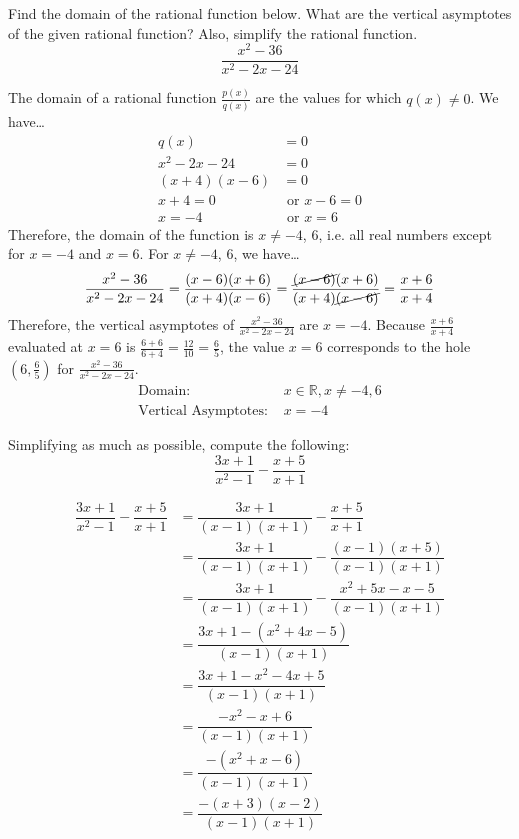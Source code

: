 \documentclass[11pt,letterpaper]{article}
\begin{document}

 Find the domain of the rational function below. What are the vertical asymptotes of the given rational function? Also, simplify the rational function. 
	\[
	\dfrac{x^2 - 36}{x^2 - 2x - 24}
	\] \pspace

\sol The domain of a rational function $\frac{p(x)}{q(x)}$ are the values for which $q(x) \neq 0$. We have\dots \pspace
	\[
	\begin{aligned}
	q(x)&= 0 \\[0.3cm]
	x^2 - 2x - 24&= 0 \\[0.3cm]
	(x + 4)(x - 6)&= 0 \\[0.3cm]
	x + 4= 0 &\text{  or  } x - 6= 0 \\[0.3cm]
	x= -4 &\text{  or  } x= 6
	\end{aligned}
	\] \pspace
Therefore, the domain of the function is $x \neq -4$, $6$, i.e. all real numbers except for $x= -4$ and $x= 6$. For $x \neq -4$, $6$, we have\dots \pspace
	\[
	\dfrac{x^2 - 36}{x^2 - 2x - 24}= \dfrac{(x - 6)(x + 6)}{(x + 4)(x - 6)}= \dfrac{\cancel{(x - 6)}(x + 6)}{(x + 4)\cancel{(x - 6)}}= \dfrac{x + 6}{x + 4}
	\] \pspace
Therefore, the vertical asymptotes of $\frac{x^2 - 36}{x^2 - 2x - 24}$ are $x= -4$. Because $\frac{x + 6}{x + 4}$ evaluated at $x= 6$ is $\frac{6 + 6}{6 + 4}= \frac{12}{10}= \frac{6}{5}$, the value $x= 6$ corresponds to the hole $(6, \frac{6}{5})$ for $\frac{x^2 - 36}{x^2 - 2x - 24}$.  
	\[
	\boxed{
	\begin{aligned}
	\text{Domain: }& x \in \mathbb{R}, x \neq -4, 6 \\
	\text{Vertical Asymptotes: }& x= -4
	\end{aligned}
	}
	\]



\newpage



 Simplifying as much as possible, compute the following:
	\[
	\dfrac{3x + 1}{x^2 - 1} - \dfrac{x + 5}{x + 1}
	\] \pspace

\sol
	\[
	\begin{aligned}
	\dfrac{3x + 1}{x^2 - 1} - \dfrac{x + 5}{x + 1}&= \dfrac{3x + 1}{(x - 1)(x + 1)} - \dfrac{x + 5}{x + 1} \\[0.3cm]
	&= \dfrac{3x + 1}{(x - 1)(x + 1)} - \dfrac{(x - 1)(x + 5)}{(x - 1)(x + 1)} \\[0.3cm]
	&= \dfrac{3x + 1}{(x - 1)(x + 1)} - \dfrac{x^2 + 5x - x - 5}{(x - 1)(x + 1)} \\[0.3cm]
	&= \dfrac{3x + 1 - (x^2 + 4x - 5)}{(x - 1)(x + 1)} \\[0.3cm]
	&= \dfrac{3x + 1 - x^2 - 4x + 5}{(x - 1)(x + 1)} \\[0.3cm]
	&= \dfrac{-x^2 - x + 6}{(x - 1)(x + 1)} \\[0.3cm]
	&= \dfrac{-(x^2 + x - 6)}{(x - 1)(x + 1)} \\[0.3cm]
	&= \dfrac{-(x + 3)(x - 2)}{(x - 1)(x + 1)} \\[0.3cm]
	\end{aligned}
	\]
\end{document}
